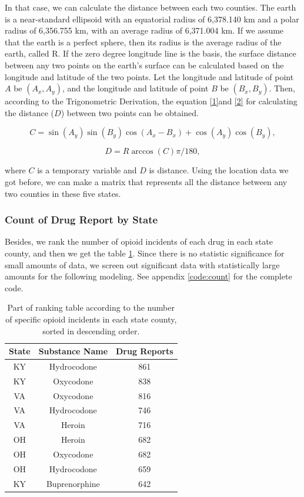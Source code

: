 \documentclass{mcmthesis}
\begin{document}
In that case, we can calculate the distance between each two counties. The earth is a near-standard ellipsoid with an equatorial radius of 6,378.140 km and a polar radius of 6,356.755 km, with an average radius of 6,371.004 km. If we assume that the earth is a perfect sphere, then its radius is the average radius of the earth, called R. If the zero degree longitude line is the basis, the surface distance between any two points on the earth's surface can be calculated based on the longitude and latitude of the two points. Let the longitude and latitude of point $A$ be $(A_x, A_y)$, and the longitude and latitude of point $B$ be $(B_x, B_y)$. Then, according to the Trigonometric Derivation, the equation \ref{1}and \ref{2} for calculating the distance ($D$) between two points can be obtained.

\begin{equation}
\label{1}
          C = \sin(A_y)\sin(B_y)\cos(A_x-B_x) + \cos(A_y)\cos(B_y),
\end{equation}

\begin{equation}
\label{2}
         D = R\arccos(C)\pi/180,
\end{equation}

    
    where $C$ is a temporary variable and $D$ is distance. Using the location data we got before, we can make a matrix that represents all the distance between any two counties in these five states.

\subsubsection{Count of Drug Report by State}

    Besides, we rank the number of opioid incidents of each drug in each state county, and then we get the table \ref{tab:my_label}. Since there is no statistic significance for small amounts of data, we screen out significant data with statistically large amounts for the following modeling. See appendix \ref{code:count} for the complete code. 
    
\begin{table}[H]
    \centering  
    \caption{Part of ranking table according to the number of specific opioid incidents in each state county, sorted in descending order.}
    \label{tab:my_label}
    \begin{tabular}{|c|c|c|}
        \hline
        State & Substance Name & Drug Reports \\\hline
        KY & Hydrocodone & 861 \\
        KY & Oxycodone & 838 \\
        VA & Oxycodone & 816 \\
        VA & Hydrocodone & 746 \\
        VA & Heroin & 716 \\
        OH & Heroin & 682 \\
        OH & Oxycodone & 682 \\
        OH & Hydrocodone & 659 \\
        KY & Buprenorphine & 642 \\\hline
    \end{tabular}
\end{table}    
    
\end{document}
